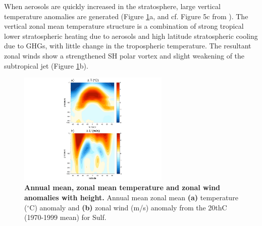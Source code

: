 \documentclass[grl]{AGUTeX}  %
\begin{document}
\begin{article}
When aerosols are quickly increased in the stratosphere, large vertical temperature anomalies are generated (Figure \ref{fig:vert}a, and cf. Figure 5c from \citet{mccusker12}). The vertical zonal mean temperature structure is a combination of strong tropical lower stratospheric heating due to aerosols \citep{ferraro11} and high latitude stratospheric cooling due to GHGs, with little change in the tropospheric temperature. The resultant zonal winds show a strengthened SH polar vortex and slight weakening of the subtropical jet (Figure \ref{fig:vert}b). %

\begin{figure}[htbp] %
\centering
 \noindent\includegraphics[width=17pc]{figures/verticalU_T_v20thC2.pdf}  %
\caption{\textbf{Annual mean, zonal mean temperature and zonal wind anomalies with height.} Annual mean zonal mean \textbf{(a)} temperature ($^\circ$C) anomaly and \textbf{(b)} zonal wind (m/s) anomaly from the 20thC (1970-1999 mean) for Sulf.}
\label{fig:vert}
\end{figure}


\end{article}
\end{document}
